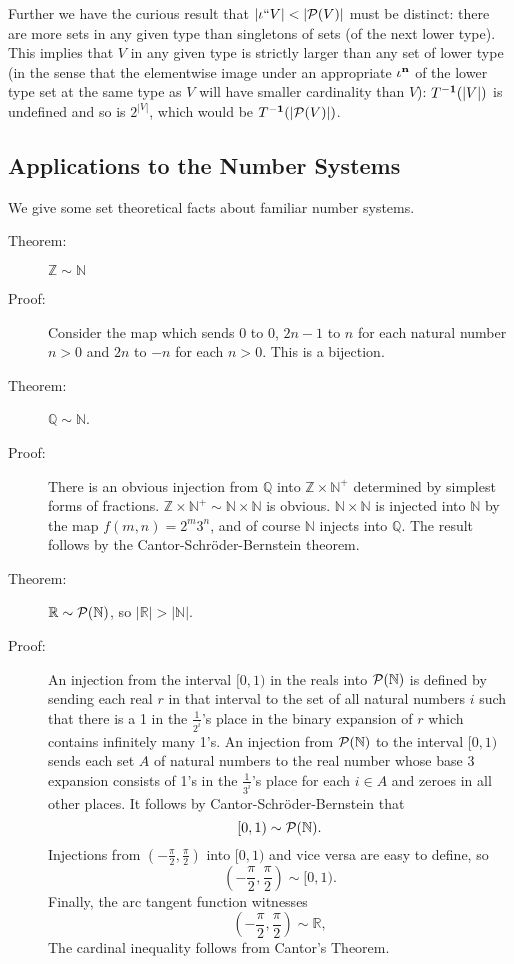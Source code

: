 \documentclass[12pt]{book}
\begin{document}
Further we have the curious result that $|\iota``V| < |{\cal P}(V)|$
must be distinct: there are more sets in any given type than
singletons of sets (of the next lower type).  This implies that $V$ in
any given type is strictly larger than any set of lower type (in the
sense that the elementwise image under an appropriate $\iota^{\bf n}$ of
the lower type set at the same type as $V$ will have smaller
cardinality than $V$): $T^{\bf -1}(|V|)$ is undefined and so is $2^{|V|}$,
which would be $T^{\bf -1}(|{\cal P}(V)|)$.

\subsection{Applications to the Number Systems}

We give some set theoretical facts about familiar number systems.

\begin{description}

\item[Theorem:] ${\mathbb Z} \sim {\mathbb N}$

\item[Proof:] Consider the map which sends 0 to 0, $2n-1$ to $n$ for
each natural number $n>0$ and $2n$ to $-n$ for each $n>0$.  This is a
bijection.

\item[Theorem:] ${\mathbb Q} \sim {\mathbb N}$.

\item[Proof:] There is an obvious injection from $\mathbb Q$ into
${\mathbb Z} \times {\mathbb N}^+$ determined by simplest forms of
fractions.  ${\mathbb Z} \times {\mathbb N}^+ \sim {\mathbb N} \times
{\mathbb N}$ is obvious.  ${\mathbb N}\times {\mathbb N}$ is injected
into $\mathbb N$ by the map $f(m,n) = 2^m3^n$, and of course ${\mathbb
N}$ injects into $\mathbb Q$.  The result follows by the
Cantor-Schr\"oder-Bernstein theorem.

\item[Theorem:] ${\mathbb R} \sim {\cal P}({\mathbb N})$, so
$|{\mathbb R}|>|{\mathbb N}|$.

\item[Proof:] An injection from the interval $[0,1)$ in the reals into
${\cal P}({\mathbb N})$ is defined by sending each real $r$ in that
interval to the set of all natural numbers $i$ such that there is a 1
in the $\frac1{2^i}$'s place in the binary expansion of $r$ which
contains infinitely many 1's.  An injection from ${\cal P}({\mathbb
N})$ to the interval $[0,1)$ sends each set $A$ of natural numbers to
the real number whose base 3 expansion consists of 1's in the
$\frac1{3^i}$'s place for each $i\in A$ and zeroes in all other
places.  It follows by Cantor-Schr\"oder-Bernstein that $$[0,1) \sim
{\cal P}({\mathbb N}).$$ Injections from $(-\frac{\pi}2,\frac{\pi}2)$
into $[0,1)$ and vice versa are easy to define, so
$$(-\frac{\pi}2,\frac{\pi}2) \sim[0,1).$$  Finally, the arc tangent function witnesses $$(-\frac{\pi}2,\frac{\pi}2) \sim {\mathbb R},$$  The cardinal inequality follows from Cantor's Theorem.

\end{description}
\end{document}
